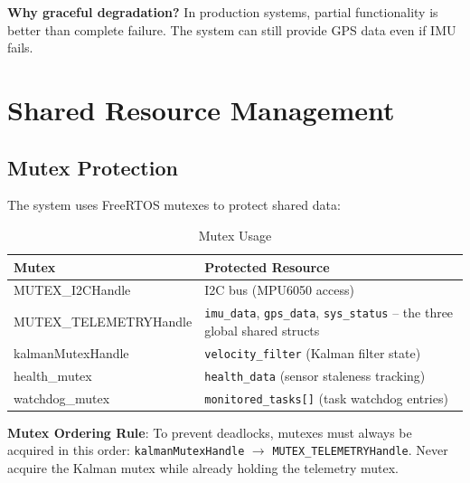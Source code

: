 \documentclass[11pt,a4paper]{article}
\begin{document}
\textbf{Why graceful degradation?} In production systems, partial functionality is better than complete failure. The system can still provide GPS data even if IMU fails.

\section{Shared Resource Management}

\subsection{Mutex Protection}
The system uses FreeRTOS mutexes to protect shared data:

\begin{table}[H]
\centering
\begin{tabular}{@{}lp{9cm}@{}}
\toprule
\textbf{Mutex} & \textbf{Protected Resource} \\
\midrule
MUTEX\_I2CHandle & I2C bus (MPU6050 access) \\
MUTEX\_TELEMETRYHandle & \texttt{imu\_data}, \texttt{gps\_data}, \texttt{sys\_status} -- the three global shared structs \\
kalmanMutexHandle & \texttt{velocity\_filter} (Kalman filter state) \\
health\_mutex & \texttt{health\_data} (sensor staleness tracking) \\
watchdog\_mutex & \texttt{monitored\_tasks[]} (task watchdog entries) \\
\bottomrule
\end{tabular}
\caption{Mutex Usage}
\end{table}

\textbf{Mutex Ordering Rule}: To prevent deadlocks, mutexes must always be acquired in this order:
\texttt{kalmanMutexHandle} $\rightarrow$ \texttt{MUTEX\_TELEMETRYHandle}. Never acquire the
Kalman mutex while already holding the telemetry mutex.
\end{document}
